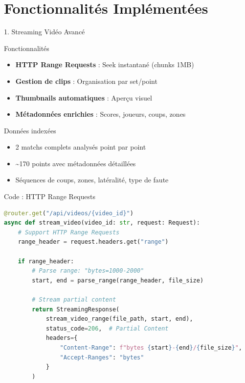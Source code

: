 \documentclass[11pt]{beamer}
\begin{document}
\section{Fonctionnalités Implémentées}

\begin{frame}{1. Streaming Vidéo Avancé}
\begin{block}{Fonctionnalités}
\begin{itemize}
    \item[$\checkmark$] \textbf{HTTP Range Requests} : Seek instantané (chunks 1MB)
    \item[$\checkmark$] \textbf{Gestion de clips} : Organisation par set/point
    \item[$\checkmark$] \textbf{Thumbnails automatiques} : Aperçu visuel
    \item[$\checkmark$] \textbf{Métadonnées enrichies} : Scores, joueurs, coups, zones
\end{itemize}
\end{block}

\begin{block}{Données indexées}
\begin{itemize}
    \item 2 matchs complets analysés point par point
    \item \textasciitilde170 points avec métadonnées détaillées
    \item Séquences de coups, zones, latéralité, type de faute
\end{itemize}
\end{block}
\end{frame}

\begin{frame}[fragile]{Code : HTTP Range Requests}
\begin{lstlisting}[language=Python, caption=Streaming vidéo optimisé]
@router.get("/api/videos/{video_id}")
async def stream_video(video_id: str, request: Request):
    # Support HTTP Range Requests
    range_header = request.headers.get("range")
    
    if range_header:
        # Parse range: "bytes=1000-2000"
        start, end = parse_range(range_header, file_size)
        
        # Stream partial content
        return StreamingResponse(
            stream_video_range(file_path, start, end),
            status_code=206,  # Partial Content
            headers={
                "Content-Range": f"bytes {start}-{end}/{file_size}",
                "Accept-Ranges": "bytes"
            }
        )
\end{lstlisting}
\end{frame}
\end{document}
